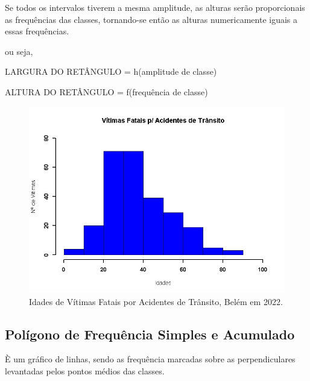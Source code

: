 Se todos os intervalos tiverem a mesma amplitude, as alturas serão
proporcionais as frequências das classes, tornando-se então as
alturas numericamente iguais a essas frequências.\vskip0.3cm

ou seja,\vskip0.3cm

LARGURA DO RETÂNGULO = h(amplitude de classe)

ALTURA DO RETÂNGULO = f(frequência de classe)


\begin{figure}
    \centering
\includegraphics[scale=0.5]{figures/histograma1.jpeg}
    \caption{Idades de Vítimas Fatais por Acidentes de Trânsito, Belém em 2022.}
    \label{fig:my_label25}
\end{figure}











\newpage
\subsection{Polígono de Frequência Simples e Acumulado}

\inic È um gráfico de linhas, sendo as frequência marcadas sobre as
perpendiculares levantadas pelos pontos médios das classes.\vskip0.3cm

